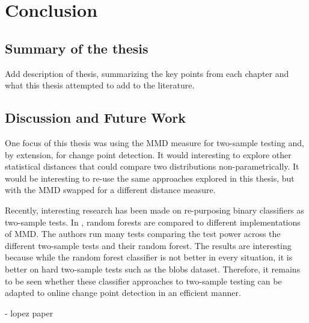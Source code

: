 \chapter{Conclusion}
\section{Summary of the thesis}
Add description of thesis, summarizing the key points from each chapter and what this thesis attempted to add to the literature.

\section{Discussion and Future Work}

One focus of this thesis was using the MMD measure for two-sample testing and, by extension, for change point detection. It would interesting to explore other statistical distances that could compare two distributions non-parametrically. It would be interesting to re-use the same approaches explored in this thesis, but with the MMD swapped for a different distance measure. 

Recently, interesting research has been made on re-purposing binary classifiers as two-sample tests. In \cite{hediger2019use}, random forests are compared to different implementations of MMD. The authors run many tests comparing the test power across the different two-sample tests and their random forest. The results are interesting because while the random forest classifier is not better in every situation, it is better on hard two-sample tests such as the blobs dataset. Therefore, it remains to be seen whether these classifier approaches to two-sample testing can be adapted to online change point detection in an efficient manner.

- lopez paper
